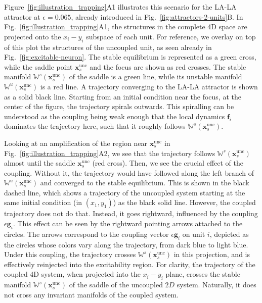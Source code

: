 Figure~\ref{fig:illustration_trapping}A1 illustrates this scenario for the LA-LA attractor at $\epsilon = 0.065$, already introduced in Fig.~\ref{fig:attractors-2-units}B. In Fig.~\ref{fig:illustration_trapping}A1, the structures in the complete 4D space are projected onto the $x_i-y_i$ subspace of each unit. For reference, we overlay on top of this plot the structures of the uncoupled unit, as seen already in Fig.~\ref{fig:excitable-neuron}. The stable equilibrium is represented as a green cross, while the saddle point $\mathbf{x}_s^\mathrm{unc}$ and the focus are shown as red crosses. The stable manifold $\mathbb{W}^s(\mathbf{x}_s^\mathrm{unc})$ of the saddle is a green line, while its unstable manifold $\mathbb{W}^u(\mathbf{x}_s^\mathrm{unc})$ is a red line. A trajectory converging to the LA-LA attractor is shown as a solid black line. Starting from an initial condition near the focus, at the center of the figure, the trajectory spirals outwards. This spiralling can be understood as the coupling being weak enough that the local dynamics $\mathbf{f}_i$ dominates the trajectory here, such that it roughly follows $\mathbb{W}^s(\mathbf{x}_s^\mathrm{unc})$.

Looking at an amplification of the region near $\mathbf{x}_s^\mathrm{unc}$ in Fig.~\ref{fig:illustration_trapping}A2, we see that the trajectory follows $\mathbb{W}^s(\mathbf{x}_s^\mathrm{unc})$ almost until the saddle $\mathbf{x}_s^\mathrm{unc}$ (red cross). Then, we see the crucial effect of the coupling. Without it, the trajectory would have followed along the left branch of $\mathbb{W}^u(\mathbf{x}_s^\mathrm{unc})$ and converged to the stable equilibrium. This is shown in the black dashed line, which shows a trajectory of the uncoupled system starting at the same initial condition (in $(x_1, y_1)$) as the black solid line. However, the coupled trajectory does not do that. Instead, it goes rightward, influenced by the coupling $\epsilon \mathbf{g}_i$. This effect can be seen by the rightward pointing arrows attached to the circles. The arrows correspond to the coupling vector $\epsilon \mathbf{g}_i$ on unit $i$, depicted as the circles whose colors vary along the trajectory, from dark blue to light blue. Under this coupling, the trajectory crosses $\mathbb{W}^s(\mathbf{x}_s^\mathrm{unc})$ in this projection, and is effectively reinjected into the excitability region.  For clarity, the trajectory of the coupled 4D system, when projected into the $x_i-y_i$ plane, crosses the stable manifold $\mathbb{W}^s(\mathbf{x}_s^\mathrm{unc})$ of the saddle of the uncoupled $2D$ system. Naturally, it does not cross any invariant manifolds of the coupled system.

